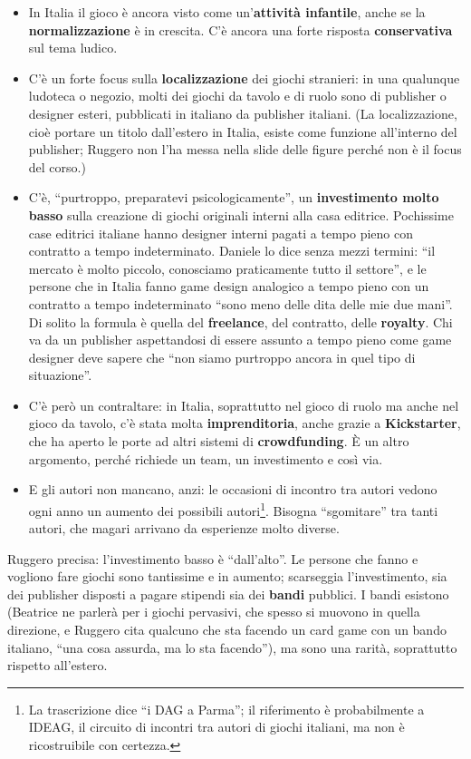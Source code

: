 \begin{itemize}
  \item In Italia il gioco è ancora visto come un'\textbf{attività infantile},
        anche se la \textbf{normalizzazione} è in crescita. C'è ancora una forte
        risposta \textbf{conservativa} sul tema ludico.
  \item C'è un forte focus sulla \textbf{localizzazione} dei giochi stranieri: in
        una qualunque ludoteca o negozio, molti dei giochi da tavolo e di ruolo
        sono di publisher o designer esteri, pubblicati in italiano da publisher
        italiani. (La localizzazione, cioè portare un titolo dall'estero in
        Italia, esiste come funzione all'interno del publisher; Ruggero non l'ha
        messa nella slide delle figure perché non è il focus del corso.)
  \item C'è, ``purtroppo, preparatevi psicologicamente'', un \textbf{investimento
        molto basso} sulla creazione di giochi originali interni alla casa
        editrice. Pochissime case editrici italiane hanno designer interni pagati
        a tempo pieno con contratto a tempo indeterminato. Daniele lo dice senza
        mezzi termini: ``il mercato è molto piccolo, conosciamo praticamente
        tutto il settore'', e le persone che in Italia fanno game design
        analogico a tempo pieno con un contratto a tempo indeterminato ``sono
        meno delle dita delle mie due mani''. Di solito la formula è quella del
        \textbf{freelance}, del contratto, delle \textbf{royalty}. Chi va da un
        publisher aspettandosi di essere assunto a tempo pieno come game
        designer deve sapere che ``non siamo purtroppo ancora in quel tipo di
        situazione''.
  \item C'è però un contraltare: in Italia, soprattutto nel gioco di ruolo ma
        anche nel gioco da tavolo, c'è stata molta \textbf{imprenditoria}, anche
        grazie a \textbf{Kickstarter}, che ha aperto le porte ad altri sistemi
        di \textbf{crowdfunding}. È un altro argomento, perché richiede un team,
        un investimento e così via.
  \item E gli autori non mancano, anzi: le occasioni di incontro tra autori
        vedono ogni anno un aumento dei possibili autori\footnote{La trascrizione
        dice ``i DAG a Parma''; il riferimento è probabilmente a IDEAG, il
        circuito di incontri tra autori di giochi italiani, ma non è
        ricostruibile con certezza.}. Bisogna ``sgomitare'' tra tanti autori,
        che magari arrivano da esperienze molto diverse.
\end{itemize}
Ruggero precisa: l'investimento basso è ``dall'alto''. Le persone che fanno e
vogliono fare giochi sono tantissime e in aumento; scarseggia l'investimento,
sia dei publisher disposti a pagare stipendi sia dei \textbf{bandi} pubblici. I
bandi esistono (Beatrice ne parlerà per i giochi pervasivi, che spesso si
muovono in quella direzione, e Ruggero cita qualcuno che sta facendo un card
game con un bando italiano, ``una cosa assurda, ma lo sta facendo''), ma sono
una rarità, soprattutto rispetto all'estero.


